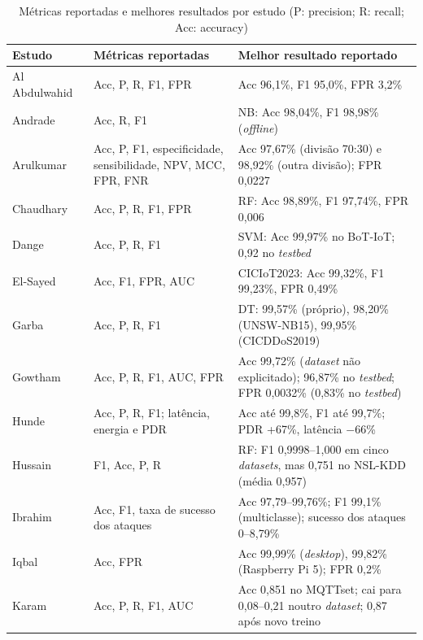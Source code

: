 \documentclass[conference,a4paper]{IEEEtran}
\begin{document}
\begin{table}[p]
\caption{Métricas reportadas e melhores resultados por estudo (P: precision; R: recall; Acc: accuracy)}\label{tab:metricas}
\centering\scriptsize
\renewcommand{\arraystretch}{0.84}
\setlength{\tabcolsep}{3pt}
\begin{tabular}{@{}>{\raggedright\arraybackslash}p{}>{\raggedright\arraybackslash}p{}>{\raggedright\arraybackslash}p{}@{}}
\toprule
Estudo & Métricas reportadas & Melhor resultado reportado \\
\midrule
Al Abdulwahid~\cite{Abdulwahid2025} & Acc, P, R, F1, FPR & Acc 96,1\%, F1 95,0\%, FPR 3,2\% \\
Andrade~\cite{andrade2024ddos} & Acc, R, F1 & NB: Acc 98,04\%, F1 98,98\% (\textit{offline}) \\
Arulkumar~\cite{Arulkumar2026} & Acc, P, F1, especificidade, sensibilidade, NPV, MCC, FPR, FNR & Acc 97,67\% (divisão 70:30) e 98,92\% (outra divisão); FPR 0,0227 \\
Chaudhary~\cite{Chaudhary2025} & Acc, P, R, F1, FPR & RF: Acc 98,89\%, F1 97,74\%, FPR 0,006 \\
Dange~\cite{dange2025dual} & Acc, P, R, F1 & SVM: Acc 99,97\% no BoT-IoT; 0,92 no \textit{testbed} \\
El-Sayed~\cite{elsayed2024mpguard} & Acc, F1, FPR, AUC & CICIoT2023: Acc 99,32\%, F1 99,23\%, FPR 0,49\% \\
Garba~\cite{garba2024sdn} & Acc, P, R, F1 & DT: 99,57\% (próprio), 98,20\% (UNSW-NB15), 99,95\% (CICDDoS2019) \\
Gowtham~\cite{gowtham2026fedmp} & Acc, P, R, F1, AUC, FPR & Acc 99,72\% (\textit{dataset} não explicitado); 96,87\% no \textit{testbed}; FPR 0,0032\% (0,83\% no \textit{testbed}) \\
Hunde~\cite{hunde2026rankshield} & Acc, P, R, F1; latência, energia e PDR & Acc até 99,8\%, F1 até 99,7\%; PDR +67\%, latência $-$66\% \\
Hussain~\cite{hussain2026postquantum} & F1, Acc, P, R & RF: F1 0,9998--1,000 em cinco \textit{datasets}, mas 0,751 no NSL-KDD (média 0,957) \\
Ibrahim~\cite{ibrahim2026purechain} & Acc, F1, taxa de sucesso dos ataques & Acc 97,79--99,76\%; F1 99,1\% (multiclasse); sucesso dos ataques 0--8,79\% \\
Iqbal~\cite{Iqbal2026} & Acc, FPR & Acc 99,99\% (\textit{desktop}), 99,82\% (Raspberry Pi 5); FPR 0,2\% \\
Karam~\cite{karam2025isaaf} & Acc, P, R, F1, AUC & Acc 0,851 no MQTTset; cai para 0,08--0,21 noutro \textit{dataset}; 0,87 após novo treino \\

\end{tabular}
\end{table}
\end{document}
